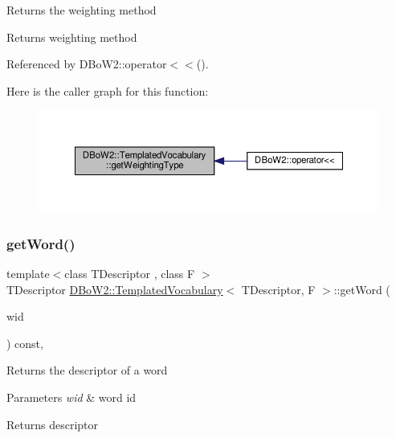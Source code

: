 Returns the weighting method \begin{DoxyReturn}{Returns}
weighting method 
\end{DoxyReturn}


Referenced by D\+Bo\+W2\+::operator$<$$<$().

Here is the caller graph for this function\+:\nopagebreak
\begin{figure}[H]
\begin{center}
\leavevmode
\includegraphics[width=350pt]{classDBoW2_1_1TemplatedVocabulary_aadb9343da87e0f00ed3da401c59132b2_icgraph}
\end{center}
\end{figure}
\mbox{\label{classDBoW2_1_1TemplatedVocabulary_a3f0d8b15b4f673bf9888ff23489430b4}} 
\subsubsection{\texorpdfstring{get\+Word()}{getWord()}}
{\footnotesize\ttfamily template$<$class T\+Descriptor , class F $>$ \\
T\+Descriptor \hyperlink{classDBoW2_1_1TemplatedVocabulary}{D\+Bo\+W2\+::\+Templated\+Vocabulary}$<$ T\+Descriptor, F $>$\+::get\+Word (\begin{DoxyParamCaption}\item[{\hyperlink{namespaceDBoW2_ab1a0d3283b2d4690a383372ed20bfeb5}{Word\+Id}}]{wid }\end{DoxyParamCaption}) const\hspace{0.3cm}{\ttfamily [inline]}, {\ttfamily [virtual]}}

Returns the descriptor of a word 
\begin{DoxyParams}{Parameters}
{\em wid} & word id \\
\hline
\end{DoxyParams}
\begin{DoxyReturn}{Returns}
descriptor 
\end{DoxyReturn}


